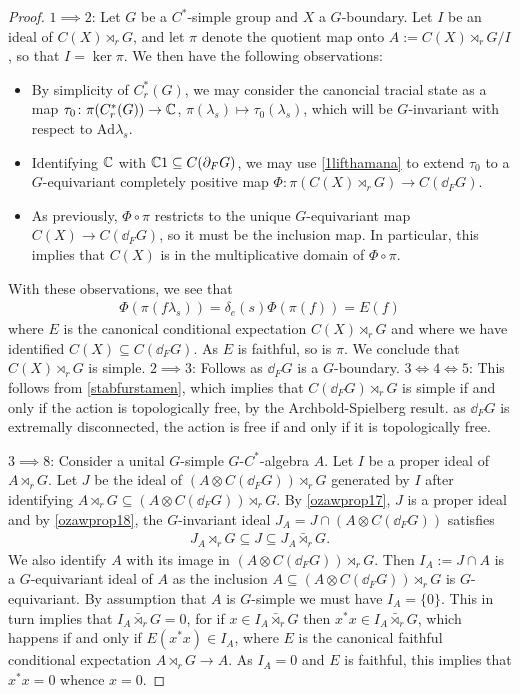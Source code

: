 \begin{proof}
	$1 \implies 2$: Let $G$ be a $C^*$-simple group and $X$ a $G$-boundary. Let $I$ be an ideal of $C(X) \rtimes_r G$, and let $\pi$ denote the quotient map onto $A:= C(X) \rtimes_r G /I$, so that $I = \ker \pi$. We then have the following observations:
	\begin{itemize}
		\item By simplicity of $C_r^*(G)$, we may consider the canoncial tracial state as a map $\tau_0 \colon \pi(C^*_r(G)) \to \mathbb{C}$, $\pi(\lambda_s) \mapsto \tau_0(\lambda_s)$, which will be $G$-invariant with respect to $\mathrm{Ad} \lambda_s$.
		\item Identifying $\mathbb{C}$ with $\mathbb{C} 1 \subseteq C(\partial_F G)$, we may use \cref{1lifthamana} to extend $\tau_0$ to a $G$-equivariant completely positive map $\Phi \colon \pi(C(X) \rtimes_r G) \to C(\dd_F G)$.
		\item As previously, $\Phi \circ \pi$ restricts to the unique $G$-equivariant map $C(X) \to C(\dd_F G)$, so it must be the inclusion map. In particular, this implies that $C(X)$ is in the multiplicative domain of $\Phi \circ \pi$.
	\end{itemize}
	With these observations, we see that
	\begin{align*}
		\Phi (\pi(f \lambda_s)) = \delta_{e}(s) \Phi(\pi(f)) = E(f)	
	\end{align*}
	where $E$ is the canonical conditional expectation $C(X) \rtimes_r G$ and where we have identified $C(X) \subseteq C(\dd_F G)$. As $E$ is faithful, so is $\pi$. We conclude that $C(X) \rtimes_r G$ is simple.
	$2 \implies 3$: Follows as $\dd_F G$ is a $G$-boundary.
	$3 \iff 4 \iff 5$: This follows from \cref{stabfurstamen}, which implies that $C(\dd_F G) \rtimes_r G$ is simple if and only if the action is topologically free, by the Archbold-Spielberg result. as $\dd_F G$ is extremally disconnected, the action is free if and only if it is topologically free.

	$3 \implies 8$: Consider a unital $G$-simple $G$-$C^*$-algebra $A$. Let $I$ be a proper ideal of $A \rtimes_r G$. Let $J$ be the ideal of $(A \otimes C(\dd_F G)) \rtimes_r G$ generated by $I$ after identifying $A \rtimes_r G \subseteq (A \otimes C(\dd_F G) ) \rtimes_r G$. By \cref{ozawprop17}, $J$ is a proper ideal and by \cref{ozawprop18}, the $G$-invariant ideal $J_A = J \cap (A \otimes C(\dd_F G))$ satisfies
	\begin{align*}
		J_A \rtimes_r G \subseteq J \subseteq J_A \bar \rtimes_r G.
	\end{align*}
	We also identify $A$ with its image in $(A \otimes C(\dd_F G)) \rtimes_r G$. Then $I_A := J \cap A$ is a $G$-equivariant ideal of $A$ as the inclusion $A \subseteq (A \otimes C(\dd_F G)) \rtimes_r G$ is $G$-equivariant. By assumption that $A$ is $G$-simple we must have $I_A = \{0\}$. This in turn implies that $I_A \bar \rtimes_r G = 0$, for if $x \in I_A \bar \rtimes_r G$ then $x^*x \in I_A \bar \rtimes_r G$, which happens if and only if $E(x^*x) \in I_A$, where $E$ is the canonical faithful conditional expectation $A \rtimes_r G \to A$. As $I_A = 0$ and $E$ is faithful, this implies that $x^*x = 0$ whence $x = 0$.


\end{proof}
